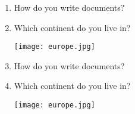 \documentclass[12pt,onside,a4paper,article]{memoir}
\newcommand\blankpage{%
    \null
    \thispagestyle{empty}%
    \addtocounter{page}{-1}%
    \newpage}
\begin{document}
\clearpage\blankpage
\begin{enumerate}
\setcounter{page}{1}

\item{How do you write documents?}
\begin{flushright}
\end{flushright}
\item{Which continent do you live in?}
\begin{flushright}
\end{flushright}
\begin{flushleft}
\texttt{[image: europe.jpg]}
\end{flushleft}
\vspace{5cm}

\item{How do you write documents?}
\begin{flushright}
\end{flushright}
\item{Which continent do you live in?}
\begin{flushright}
\end{flushright}
\begin{flushleft}
\texttt{[image: europe.jpg]}
\end{flushleft}
\vspace{5cm}


\end{enumerate}
\end{document}
